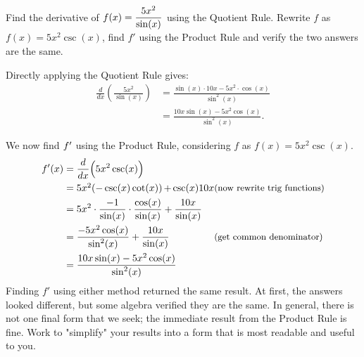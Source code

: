 \begin{example} \label{Ex:2.5.Eg5}
Find the derivative of $\displaystyle f(x) = \frac{5x^2}{\sin(x)}$ using the Quotient Rule. Rewrite $f$ as $f(x) = 5x^2\csc(x)$, find $f'$ using the Product Rule and verify the two answers are the same.

\solution Directly applying the Quotient Rule gives:
\begin{align*}
\frac{d}{dx}\left(\frac{5x^2}{\sin(x)}\right) &= \frac{\sin(x) \cdot 10x - 5x^2\cdot \cos(x)}{\sin^2(x)} \\
&=	\frac{10x\sin(x) - 5x^2\cos(x)}{\sin^2(x)}.
\end{align*}

We now find $f'$ using the Product Rule, considering $f$ as $f(x) = 5x^2\csc(x)$.
\begin{align*}
\fp(x) &= \frac{d}{dx}\Big(5x^2\csc(x)\Big) \\
&=	\parbox{140pt}{$5x^2(-\csc(x) \cot(x)) + \csc(x) 10x$} \text{\small (now rewrite trig functions)}\\
&= 5x^2\cdot \frac{-1}{\sin(x)}\cdot \frac{\cos(x)}{\sin(x)} + \frac{10x}{\sin(x)}\\
&=	\parbox{140pt}{$\ds\frac{-5x^2\cos(x)}{\sin ^2(x)}+\frac{10x}{\sin(x)}$} \text{\small (get common denominator)}\\
&= \frac{10x\sin(x) - 5x^2\cos(x)}{\sin^2(x)}
\end{align*}
Finding $f'$ using either method returned the same result. At first, the answers looked different, but some algebra verified they are the same. In general, there is not one final form that we seek; the immediate result from the Product Rule is fine. Work to "simplify" your results into a form that is most readable and useful to you.
\end{example}